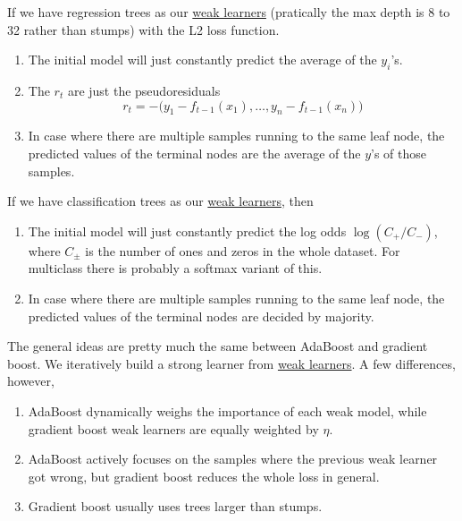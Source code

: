   \begin{example}
    \label{ex:regression-trees}
    If we have regression trees as our \hyperref[def:weak-learner]{weak learners} (pratically the max depth is 8 to 32 rather than stumps) with the L2 loss function.  
    \begin{enumerate}
      \item The initial model will just constantly predict the average of the $y_i$'s. 
      \item The $r_t$ are just the pseudoresiduals
        \begin{equation}
          r_t = -\big( y_1 - f_{t-1} (x_1), \ldots, y_n - f_{t-1} (x_n) \big)
        \end{equation}
      \item In case where there are multiple samples running to the same leaf node, the predicted values of the terminal nodes are the average of the $y$'s of those samples. 
    \end{enumerate}
  \end{example}

  \begin{example}
    \label{ex:gradient-boosting-classification}
 
    If we have classification trees as our \hyperref[def:weak-learner]{weak learners}, then 
    \begin{enumerate}
      \item The initial model will just constantly predict the log odds $\log(C_{+} / C_{-})$, where $C_{\pm}$ is the number of ones and zeros in the whole dataset. For multiclass there is probably a softmax variant of this. 
      \item In case where there are multiple samples running to the same leaf node, the predicted values of the terminal nodes are decided by majority. 
    \end{enumerate}
  \end{example}

  The general ideas are pretty much the same between AdaBoost and gradient boost. We iteratively build a strong learner from \hyperref[def:weak-learner]{weak learners}. A few differences, however, 
  \begin{enumerate}
    \item AdaBoost dynamically weighs the importance of each weak model, while gradient boost weak learners are equally weighted by $\eta$. 
    \item AdaBoost actively focuses on the samples where the previous weak learner got wrong, but gradient boost reduces the whole loss in general. 
    \item Gradient boost usually uses trees larger than stumps. 
  \end{enumerate}

